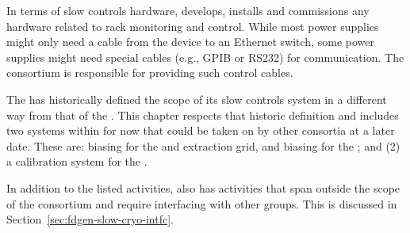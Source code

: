 In terms of slow controls hardware,   develops, installs and
commissions any hardware related to rack monitoring and control. While
most power supplies might only need a cable from the device to an
Ethernet switch, some power supplies might need special cables (e.g., 
GPIB or RS232) for communication. The  consortium is responsible for
providing such control cables.

The  has historically defined the scope of its slow controls system in a different way from that of the .  This chapter respects that historic definition and includes two systems within  for now that could be taken on by other consortia at a later date.  These are:  biasing for the  and extraction grid, and   biasing for the \dual {}; and (2)  a calibration system for the .

In addition to the listed activities,  also has activities that span
outside the scope of the consortium and require interfacing with other
groups. This is discussed in Section~\ref{sec:fdgen-slow-cryo-intfc}.

